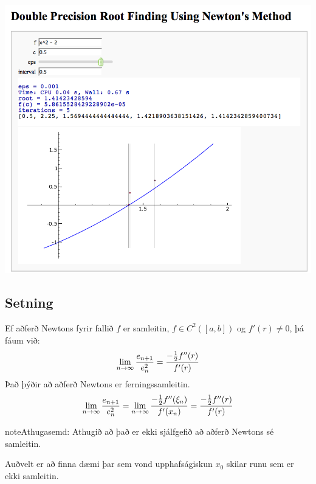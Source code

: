 \documentclass[letterpaper,10pt,icelandic]{sphinxmanual}
\begin{document}
\begin{center}
\includegraphics[width=8 cm,keepaspectratio=true]{newton.png}

\end{center}

\subsection{Setning}
\label{kafli02:id7}
Ef aðferð Newtons fyrir fallið \(f\) er samleitin,
\(f\in C^2([a,b])\) og \(f'(r)\neq 0\), þá fáum við:
\begin{gather}
\begin{split}\lim_{n\to \infty}\dfrac{e_{n+1}}{e_n^2}=\frac{-\frac{1}{2}f''(r)}
        {f'(r)}\end{split}\notag
\end{gather}
Það þýðir að aðferð Newtons er ferningssamleitin.
\begin{gather}
\begin{split}\lim_{n\to \infty}\dfrac{e_{n+1}}{e_n^2}=
\lim_{n\to \infty}\frac{-\frac{1}{2}f''(\xi_n)}{f'(x_n)} =
\frac{-\frac{1}{2}f''(r)}{f'(r)}\end{split}\notag
\end{gather}
\begin{notice}{note}{Athugasemd:}
Athugið að það er ekki sjálfgefið að aðferð Newtons sé samleitin.

Auðvelt er að finna dæmi þar sem vond upphafságiskun \(x_0\) skilar
runu sem er ekki samleitin.
\end{notice}
\end{document}
